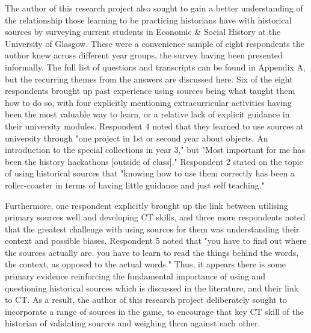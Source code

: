 \documentclass{l4proj}
\begin{document}
The author of this research project also sought to gain a better understanding of the relationship those learning to be practicing historians have with historical sources by surveying current students in Economic & Social History at the University of Glasgow. These were a convenience sample of eight respondents the author knew across different year groups, the survey having been presented informally. The full list of questions and transcripts can be found in Appendix A, but the recurring themes from the answers are discussed here. Six of the eight respondents brought up past experience using sources being what taught them how to do so, with four explicitly mentioning extracurricular activities having been the most valuable way to learn, or a relative lack of explicit guidance in their university modules. Respondent 4 noted that they learned to use sources at university through "one project in 1st or second year about objects. An introduction to the special collections in year 3," but "Most important for me has been the history hackathons [outside of class]." Respondent 2 stated on the topic of using historical sources that "knowing how to use them correctly has been a roller-coaster in terms of having little guidance and just self teaching." 

Furthermore, one respondent explicitly brought up the link between utilising primary sources well and developing CT skills, and three more respondents noted that the greatest challenge with using sources for them was understanding their context and possible biases. Respondent 5 noted that "you have to find out where the sources actually are. you have to learn to read the things behind the words, the context, as opposed to the actual words." Thus, it appears there is some primary evidence reinforcing the fundamental importance of using and questioning historical sources which is discussed in the literature, and their link to CT. As a result, the author of this research project deliberately sought to incorporate a range of sources in the game, to encourage that key CT skill of the historian of validating sources and weighing them against each other.
\end{document}
